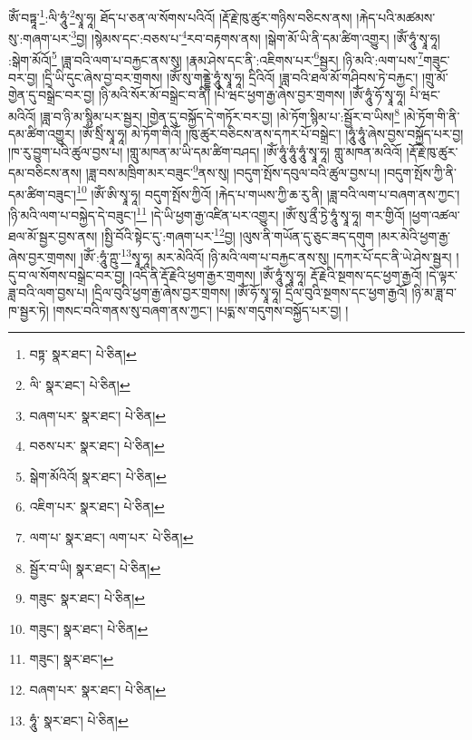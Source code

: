 ཨོཾ་བཏྟཱ་\footnote{བཏྟ་  སྣར་ཐང་།  པེ་ཅིན། }:ལི་ཧཱུཾ་\footnote{ལི་  སྣར་ཐང་།  པེ་ཅིན། }སྭཱ་ཧཱ། ཐོད་པ་ཅན་ལ་སོགས་པའིའོ། །རྡོ་རྗེ་ཁུ་ཚུར་གཉིས་བཅིངས་ནས། །རྐེད་པའི་མཚམས་སུ་:གཞག་པར་\footnote{བཞག་པར་  སྣར་ཐང་།  པེ་ཅིན། }བྱ། །སྙེམས་དང་:བཅས་པ་\footnote{བཅས་པར་  སྣར་ཐང་།  པེ་ཅིན། }རབ་བརྟགས་ནས། །སྒེག་མོ་ཡི་ནི་དམ་ཚིག་འགྱུར། །ཨོཾ་ཧཱུཾ་སྭཱ་ཧཱ། :སྒེག་མོའོ།\footnote{སྒེག་མོའིའོ།  སྣར་ཐང་།  པེ་ཅིན། } །ཟླ་བའི་ལག་པ་བརྐྱང་ནས་སུ། །རྣམ་ཤེས་དང་ནི་:འཇིགས་པར་\footnote{འཇིག་པར་  སྣར་ཐང་།  པེ་ཅིན། }སྦྱར། །ཉི་མའི་:ལག་པས་\footnote{ལག་པ་  སྣར་ཐང་། ལག་པར་  པེ་ཅིན། }གཟུང་བར་བྱ། །དྲི་ཡི་དུང་ཞེས་བྱ་བར་གྲགས། །ཨོཾ་སུ་གནྡྷེ་ཧཱུཾ་སྭཱ་ཧཱ། དྲིའིའོ། །ཟླ་བའི་ཐལ་མོ་གཤིབས་ཏེ་བརྐྱང་། །གྲུ་མོ་གྱེན་དུ་བསྒྲེང་བར་བྱ། །ཉི་མའི་སོར་མོ་བསྒྲེང་བ་ནི། །པི་ཝང་ཕྱག་རྒྱ་ཞེས་བྱར་གྲགས། །ཨོཾ་ཧཱུཾ་ཧོ་སྭཱ་ཧཱ། པི་ཝང་མའིའོ། །ཟླ་བ་ཉི་མ་སྙིམ་པར་སྦྱར། །གྱེན་དུ་བསྐྱོད་དེ་གཏོར་བར་བྱ། །མེ་ཏོག་སྙིམ་པ་:སྦྱོར་བ་ཡིས།\footnote{སྦྱོར་བ་ཡི།  སྣར་ཐང་།  པེ་ཅིན། } །མེ་ཏོག་གི་ནི་དམ་ཚིག་འགྱུར། །ཨོཾ་སྲིཾ་སྭཱ་ཧཱ། མེ་ཏོག་གིའོ། །ཁུ་ཚུར་བཅིངས་ནས་དཀར་པོ་བསྒྲེང་། །ཧཱུཾ་ཧཱུཾ་ཞེས་བྱས་བསྐྱོད་པར་བྱ། །ཁ་རུ་བྱུག་པའི་ཚུལ་བྱས་པ། །གླུ་མཁན་མ་ཡི་དམ་ཚིག་བཤད། །ཨོཾ་ཧཱུཾ་ཧཱུཾ་ཧཱུཾ་སྭཱ་ཧཱ། གླུ་མཁན་མའིའོ། །རྡོ་རྗེ་ཁུ་ཚུར་དམ་བཅིངས་ནས། །ཟླ་བས་མཁྲིག་མར་བཟུང་\footnote{གཟུང་  སྣར་ཐང་།  པེ་ཅིན། }ནས་སུ། །བདུག་སྤོས་དབུལ་བའི་ཚུལ་བྱས་པ། །བདུག་སྤོས་ཀྱི་ནི་དམ་ཚིག་བཟུང་།\footnote{གཟུང་།  སྣར་ཐང་།  པེ་ཅིན། } །ཨོཾ་ཨི་སྭཱ་ཧཱ། བདུག་སྤོས་ཀྱིའོ། །རྐེད་པ་གཡས་ཀྱི་ཆ་རུ་ནི། །ཟླ་བའི་ལག་པ་བཞག་ནས་ཀྱང་། །ཉི་མའི་ལག་པ་བསྐྱེད་དེ་བཟུང་།\footnote{གཟུང་།  སྣར་ཐང་། } །དེ་ཡི་ཕྱག་རྒྱ་འཛིན་པར་འགྱུར། །ཨོཾ་སུ་ནྲྀ་ཏྱེ་ཧཱུཾ་སྭཱ་ཧཱ། གར་གྱིའོ། །ཕྱག་འཚལ་ཐལ་མོ་སྦྱར་བྱས་ནས། །སྤྱི་བོའི་སྟེང་དུ་:གཞག་པར་\footnote{བཞག་པར་  སྣར་ཐང་།  པེ་ཅིན། }བྱ། །ལུས་ནི་གཡོན་དུ་ཅུང་ཟད་དགུག །མར་མེའི་ཕྱག་རྒྱ་ཞེས་བྱར་གྲགས། །ཨོཾ་:ཧཱུཾ་ཀྵུ་\footnote{ཧཱུཾ་  སྣར་ཐང་།  པེ་ཅིན། }སྭཱ་ཧཱ། མར་མེའིའོ། །ཉི་མའི་ལག་པ་བརྐྱང་ནས་སུ། །དཀར་པོ་དང་ནི་ཡེ་ཤེས་སྦྱར། །དུ་བ་ལ་སོགས་བསྒྲེང་བར་བྱ། །འདི་ནི་རྡོ་རྗེའི་ཕྱག་རྒྱར་གྲགས། །ཨོཾ་ཧཱུཾ་སྭཱ་ཧཱ། རྡོ་རྗེའི་སྔགས་དང་ཕྱག་རྒྱའོ། །དེ་ལྟར་ཟླ་བའི་ལག་བྱས་པ། །དྲིལ་བུའི་ཕྱག་རྒྱ་ཞེས་བྱར་གྲགས། །ཨོཾ་ཧོ་སྭཱ་ཧཱ། དྲིལ་བུའི་སྔགས་དང་ཕྱག་རྒྱའོ། །ཉི་མ་ཟླ་བ་ཁ་སྦྱར་ཏེ། །གསང་བའི་གནས་སུ་བཞག་ནས་ཀྱང་། །པདྨ་ས་གདུགས་བསྐྱོད་པར་བྱ། །
